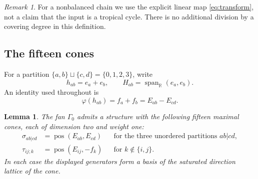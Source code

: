 \documentclass[11pt]{article}
\newtheorem{lemma}[theorem]{Lemma}
\theoremstyle{definition}
\theoremstyle{remark}
\newtheorem{remark}[theorem]{Remark}
\newcommand{\R}{\mathbb R}
\newcommand{\pos}{\operatorname{pos}}
\newcommand{\Span}{\operatorname{span}_{\R}}
\begin{document}
\begin{remark}
For a nonbalanced chain we use the explicit linear map
\eqref{eq:transform}, not a claim that the input is a tropical cycle.
There is no additional division by a covering degree in this definition.
\end{remark}

\subsection{The fifteen cones}

For a partition $\{a,b\}\sqcup\{c,d\}=\{0,1,2,3\}$, write
\[
 h_{ab}=e_a+e_b,
 \qquad H_{ab}=\Span(e_a,e_b).
\]
An identity used throughout is
\begin{equation}\label{eq:identity}
 \varphi(h_{ab})=f_a+f_b=E_{ab}-E_{cd}.
\end{equation}

\begin{lemma}\label{lem:fan}
The fan $\Gamma_0$ admits a structure with the following fifteen maximal
cones, each of dimension two and weight one:
\begin{align}
 \sigma_{ab|cd}&=\pos(E_{ab},E_{cd})
       &&\text{for the three unordered partitions }ab|cd,
       \label{eq:central}\\
 \tau_{ij;k}&=\pos(E_{ij},-f_k)
       &&\text{for }k\notin\{i,j\}.
       \label{eq:side}
\end{align}
In each case the displayed generators form a basis of the saturated
direction lattice of the cone.
\end{lemma}
\end{document}
